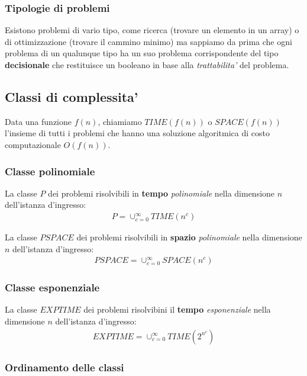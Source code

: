 \documentclass{article}
\begin{document}
\subsubsection{Tipologie di problemi}

Esistono problemi di vario tipo, come ricerca (trovare un elemento in un array)
o di ottimizzazione (trovare il cammino minimo) ma sappiamo da prima che ogni
problema di un qualunque tipo ha un suo problema corrispondente del tipo
\textbf{decisionale} che restituisce un booleano in base alla \emph{trattabilita'}
del problema.

\subsection{Classi di complessita'}

Data una funzione $f(n)$, chiamiamo $TIME(f(n))$ o $SPACE(f(n))$ l'insieme di tutti
i problemi che hanno una soluzione algoritmica di costo computazionale $O(f(n))$.

\subsubsection{Classe polinomiale}

La classe $P$ dei problemi risolvibili in \textbf{tempo} \emph{polinomiale} nella
dimensione $n$ dell'istanza d'ingresso:
\begin{align*}
  P = \cup^{\infty}_{c=0} TIME(n^c)
\end{align*}

La classe $PSPACE$ dei problemi risolvibili in \textbf{spazio} \emph{polinomiale}
nella dimensione $n$ dell'istanza d'ingresso:
\begin{align*}
  PSPACE = \cup^{\infty}_{c=0} SPACE(n^c)
\end{align*}

\subsubsection{Classe esponenziale}

La classe $EXPTIME$ dei problemi risolvibini il \textbf{tempo} \emph{esponenziale}
nella dimensione $n$ dell'istanza d'ingresso:
\begin{align*}
  EXPTIME = \cup^{\infty}_{c=0} TIME(2^{n^c})
\end{align*}

\subsubsection{Ordinamento delle classi}
\end{document}
